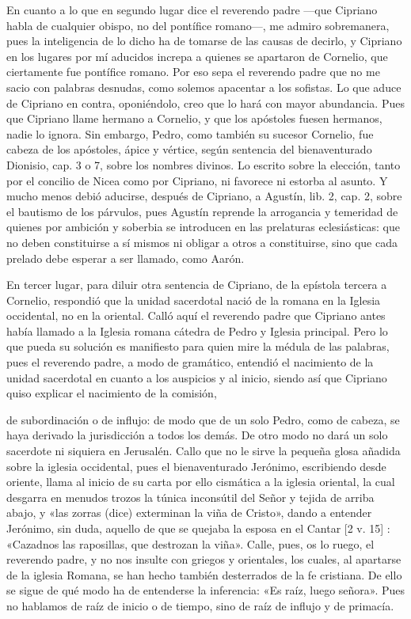 En cuanto a lo que en segundo lugar dice el reverendo padre —que Cipriano habla de cualquier obispo, no del pontífice romano—, me admiro sobremanera, pues la inteligencia de lo dicho ha de tomarse de las causas de decirlo, y Cipriano en los lugares por mí aducidos increpa a quienes se apartaron de Cornelio, que ciertamente fue pontífice romano. Por eso sepa el reverendo padre que no me sacio con palabras desnudas, como solemos apacentar a los sofistas. Lo que aduce de Cipriano en contra, oponiéndolo, creo que lo hará con mayor abundancia. Pues que Cipriano llame hermano a Cornelio, y que los apóstoles fuesen hermanos, nadie lo ignora. Sin embargo, Pedro, como también su sucesor Cornelio, fue cabeza de los apóstoles, ápice y vértice, según sentencia del bienaventurado Dionisio, cap. 3 o 7, sobre los nombres divinos. Lo escrito sobre la elección, tanto por el concilio de Nicea como por Cipriano, ni favorece ni estorba al asunto. Y mucho menos debió aducirse, después de Cipriano, a Agustín, lib. 2, cap. 2, sobre el bautismo de los párvulos, pues Agustín reprende la arrogancia y temeridad de quienes por ambición y soberbia se introducen en las prelaturas eclesiásticas: que no deben constituirse a sí mismos ni obligar a otros a constituirse, sino que cada prelado debe esperar a ser llamado, como Aarón.

En tercer lugar, para diluir otra sentencia de Cipriano, de la epístola tercera a Cornelio, respondió que la unidad sacerdotal nació de la romana en la Iglesia occidental, no en la oriental. Calló aquí el reverendo padre que Cipriano antes había llamado a la Iglesia romana cátedra de Pedro y Iglesia principal. Pero lo que pueda su solución es manifiesto para quien mire la médula de las palabras, pues el reverendo padre, a modo de gramático, entendió el nacimiento de la unidad sacerdotal en cuanto a los auspicios y al inicio, siendo así que Cipriano quiso explicar el nacimiento de la comisión,

de subordinación o de influjo: de modo que de un solo Pedro, como de cabeza, se haya derivado la jurisdicción a todos los demás. De otro modo no dará un solo sacerdote ni siquiera en Jerusalén. Callo que no le sirve la pequeña glosa añadida sobre la iglesia occidental, pues el bienaventurado Jerónimo, escribiendo desde oriente, llama al inicio de su carta por ello cismática a la iglesia oriental, la cual desgarra en menudos trozos la túnica inconsútil del Señor y tejida de arriba abajo, y «las zorras (dice) exterminan la viña de Cristo», dando a entender Jerónimo, sin duda, aquello de que se quejaba la esposa en el Cantar [2 v. 15] \marginpar{\small[262]}: «Cazadnos las raposillas, que destrozan la viña». Calle, pues, os lo ruego, el reverendo padre, y no nos insulte con griegos y orientales, los cuales, al apartarse de la iglesia Romana, se han hecho también desterrados de la fe cristiana. De ello se sigue de qué modo ha de entenderse la inferencia: «Es raíz, luego señora». Pues no hablamos de raíz de inicio o de tiempo, sino de raíz de influjo y de primacía.

